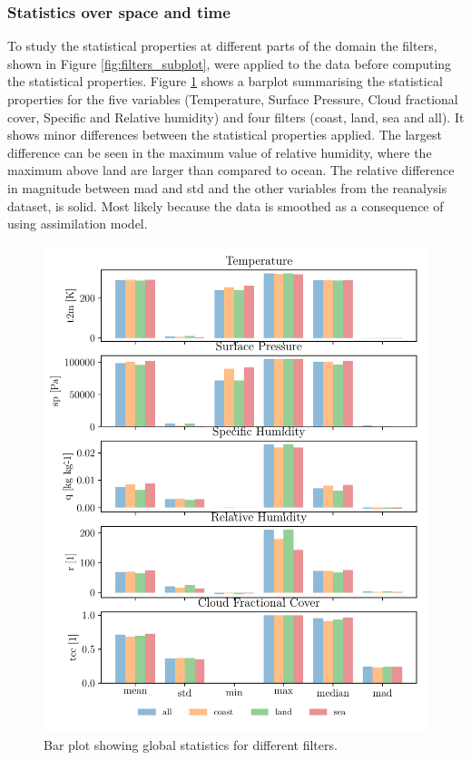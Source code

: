 \subsubsection{Statistics over space and time}
To study the statistical properties at different parts of the domain the filters, shown in Figure \ref{fig:filters_subplot}, were applied to the data before computing the statistical properties. Figure \ref{fig:bar_plot_global_stats} shows a barplot summarising the statistical properties for the five variables (Temperature, Surface Pressure, Cloud fractional cover, Specific and Relative humidity) and four filters (coast, land, sea and all). It shows minor differences between the statistical properties applied. The largest difference can be seen in the maximum value of relative humidity, where the maximum above land are larger than compared to ocean. The relative difference in magnitude between \acrshort{mad} and \acrshort{std} and the other variables from the reanalysis dataset, is solid. Most likely because the data is smoothed as a consequence of using assimilation model. 
\begin{figure}[ht]
    \centering
    \includegraphics{python_figs/bar_plot_global_statistics_new_legend.pdf}
    \caption{Bar plot showing global statistics for different filters.}
    \label{fig:bar_plot_global_stats}
\end{figure}

